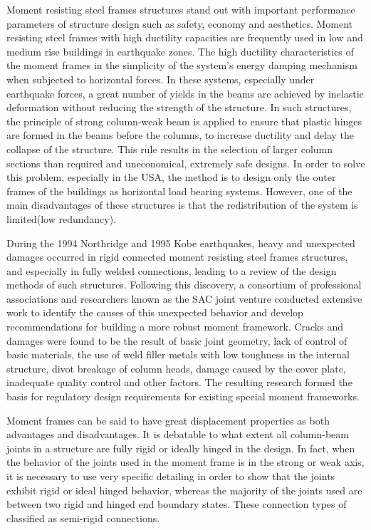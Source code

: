 Moment resisting steel frames structures stand out with important
performance parameters of structure design such as safety, economy
and aesthetics. Moment resisting steel frames with high ductility
capacities are frequently used in low and medium rise buildings in
earthquake zones. The high ductility characteristics of the moment
frames in the simplicity of the system's energy damping mechanism
when subjected to horizontal forces. In these systems, especially
under earthquake forces, a great number of yields in the beams are
achieved by inelastic deformation without reducing the strength of
the structure. In such structures, the principle of strong column-weak
beam is applied to ensure that plastic hinges are formed in the beams
before the columns, to increase ductility and delay the collapse of
the structure. This rule results in the selection of larger column
sections than required and uneconomical, extremely safe designs. In
order to solve this problem, especially in the USA, the method is
to design only the outer frames of the buildings as horizontal load
bearing systems. However, one of the main disadvantages of these structures
is that the redistribution of the system is limited(low redundancy).

During the 1994 Northridge and 1995 Kobe earthquakes, heavy and unexpected
damages occurred in rigid connected moment resisting steel frames
structures, and especially in fully welded connections, leading to
a review of the design methods of such structures. Following this
discovery, a consortium of professional associations and researchers
known as the SAC joint venture conducted extensive work to identify
the causes of this unexpected behavior and develop recommendations
for building a more robust moment framework. Cracks and damages were
found to be the result of basic joint geometry, lack of control of
basic materials, the use of weld filler metals with low toughness
in the internal structure, divot breakage of column heads, damage
caused by the cover plate, inadequate quality control and other factors.
The resulting research formed the basis for regulatory design requirements
for existing special moment frameworks.

Moment frames can be said to have great displacement properties as
both advantages and disadvantages. It is debatable to what extent
all column-beam joints in a structure are fully rigid or ideally hinged
in the design. In fact, when the behavior of the joints used in the
moment frame is in the strong or weak axis, it is necessary to use
very specific detailing in order to show that the joints exhibit rigid
or ideal hinged behavior, whereas the majority of the joints used
are between two rigid and hinged end boundary states. These connection
types of classified as semi-rigid connections.

